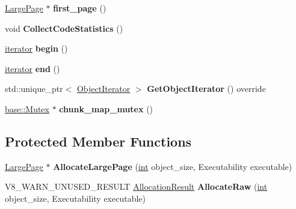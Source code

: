 \begin{DoxyCompactItemize}
\mbox{\hyperlink{classv8_1_1internal_1_1LargePage}{Large\+Page}} $\ast$ {\bfseries first\+\_\+page} ()
\item 
\mbox{\label{classv8_1_1internal_1_1LargeObjectSpace_a9652b4618505494822a5b57f53db2757}} 
void {\bfseries Collect\+Code\+Statistics} ()
\item 
\mbox{\label{classv8_1_1internal_1_1LargeObjectSpace_a1c61050720c6566e3bc42e6fa9873eab}} 
\mbox{\hyperlink{classv8_1_1internal_1_1PageIteratorImpl}{iterator}} {\bfseries begin} ()
\item 
\mbox{\label{classv8_1_1internal_1_1LargeObjectSpace_a1c3a9f77db7725e437cc14d911627ae9}} 
\mbox{\hyperlink{classv8_1_1internal_1_1PageIteratorImpl}{iterator}} {\bfseries end} ()
\item 
\mbox{\label{classv8_1_1internal_1_1LargeObjectSpace_a349969b8266dfca3564ea71fcdfac7f7}} 
std\+::unique\+\_\+ptr$<$ \mbox{\hyperlink{classv8_1_1internal_1_1ObjectIterator}{Object\+Iterator}} $>$ {\bfseries Get\+Object\+Iterator} () override
\item 
\mbox{\label{classv8_1_1internal_1_1LargeObjectSpace_a9be70e4d3fc7aba4a44222bd11e114e2}} 
\mbox{\hyperlink{classv8_1_1base_1_1Mutex}{base\+::\+Mutex}} $\ast$ {\bfseries chunk\+\_\+map\+\_\+mutex} ()
\end{DoxyCompactItemize}
\subsection*{Protected Member Functions}
\begin{DoxyCompactItemize}
\item 
\mbox{\label{classv8_1_1internal_1_1LargeObjectSpace_a141228fbfae83afdb2ef23d865e2ed6e}} 
\mbox{\hyperlink{classv8_1_1internal_1_1LargePage}{Large\+Page}} $\ast$ {\bfseries Allocate\+Large\+Page} (\mbox{\hyperlink{classint}{int}} object\+\_\+size, Executability executable)
\item 
\mbox{\label{classv8_1_1internal_1_1LargeObjectSpace_a75291aedc520f2efa326ff6c2d024b5e}} 
V8\+\_\+\+W\+A\+R\+N\+\_\+\+U\+N\+U\+S\+E\+D\+\_\+\+R\+E\+S\+U\+LT \mbox{\hyperlink{classv8_1_1internal_1_1AllocationResult}{Allocation\+Result}} {\bfseries Allocate\+Raw} (\mbox{\hyperlink{classint}{int}} object\+\_\+size, Executability executable)
\end{DoxyCompactItemize}
